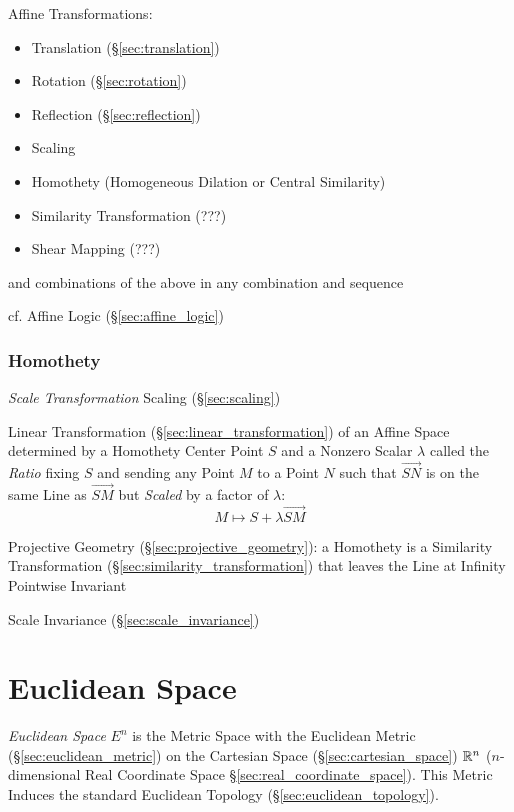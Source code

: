 Affine Transformations:
\begin{itemize}
\item Translation (\S\ref{sec:translation})
\item Rotation (\S\ref{sec:rotation})
\item Reflection (\S\ref{sec:reflection})
\item Scaling
\item Homothety (Homogeneous Dilation or Central Similarity)
\item Similarity Transformation (???)
\item Shear Mapping (???)
\end{itemize}
and combinations of the above in any combination and sequence

cf. Affine Logic (\S\ref{sec:affine_logic})



\subsubsection{Homothety}\label{sec:homothety}


\emph{Scale Transformation} \fist Scaling (\S\ref{sec:scaling})

Linear Transformation (\S\ref{sec:linear_transformation}) of an Affine Space
determined by a Homothety Center Point $S$ and a Nonzero Scalar $\lambda$
called the \emph{Ratio} fixing $S$ and sending any Point $M$ to a Point $N$
such that $\vec{SN}$ is on the same Line as $\vec{SM}$ but \emph{Scaled} by a
factor of $\lambda$:
\[
  M \mapsto S + \lambda\vec{SM}
\]

\fist Projective Geometry (\S\ref{sec:projective_geometry}): a Homothety is a
Similarity Transformation (\S\ref{sec:similarity_transformation}) that leaves
the Line at Infinity Pointwise Invariant

\fist Scale Invariance (\S\ref{sec:scale_invariance})



\section{Euclidean Space}\label{sec:euclidean_space}

\emph{Euclidean Space} $\xspace{E}^n$ is the Metric Space with the Euclidean
Metric (\S\ref{sec:euclidean_metric}) on the Cartesian Space
(\S\ref{sec:cartesian_space}) $\mathbb{R}^n$ ($n$-dimensional Real Coordinate Space
\S\ref{sec:real_coordinate_space}). This Metric Induces the standard Euclidean
Topology (\S\ref{sec:euclidean_topology}).

